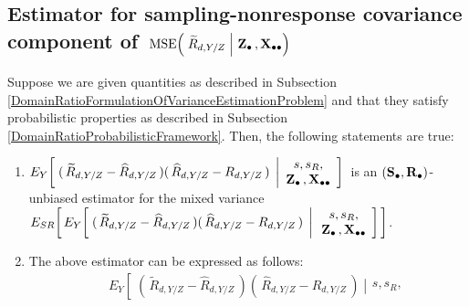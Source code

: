 
\vskip 0.5cm
\subsection{Estimator for sampling-nonresponse covariance component of
\,$\textnormal{MSE}\!\left(\,\left.\widetilde{R}_{d,Y/Z}\;\right\vert\,\mathbf{Z}_{\bullet}\,,\mathbf{X}_{\bullet\bullet}\right)$}
\setcounter{theorem}{0}


\begin{lemma}
\label{DomainRatioMixedVariance}
\mbox{}
\vskip 0.1cm
\noindent
Suppose we are given quantities as described in Subsection
\ref{DomainRatioFormulationOfVarianceEstimationProblem}
and
that they satisfy probabilistic properties as described in Subsection
\ref{DomainRatioProbabilisticFramework}.
\vskip 0.1cm
\noindent
Then, the following statements are true:
\renewcommand{\theenumi}{\roman{enumi}}
\renewcommand{\labelenumi}{\mbox{}\;\;\,(\theenumi)$\quad$}
\begin{enumerate}
\item
    $
    E_{Y}\!\left[\;
        (\,\widetilde{R}_{d,Y/Z} - \widehat{R}_{d,Y/Z}\,)
        (\,  \widehat{R}_{d,Y/Z} - R_{d,Y/Z}\,)
        \;\left\vert
        \begin{array}{c}
            s,s_{R},
            \\
            \mathbf{Z}_{\bullet}\,,\mathbf{X}_{\bullet\bullet}
            \end{array}
        \right.
        \!\right]
    $\,
    is an $(\mathbf{S}_{\bullet},\mathbf{R}_{\bullet})$-unbiased estimator for the mixed variance
    \,$
    E_{SR}\!\left[\,
    E_{Y}\!\left[\;
        (\,\widetilde{R}_{d,Y/Z} - \widehat{R}_{d,Y/Z}\,)
        (\,  \widehat{R}_{d,Y/Z} - R_{d,Y/Z}\,)
        \;\left\vert\,
        \begin{array}{c}
            s,s_{R},
            \\
            \mathbf{Z}_{\bullet}\,,\mathbf{X}_{\bullet\bullet}
            \end{array}
        \right.
        \!\right]
        \,\right]
    $.
\item
    The above estimator can be expressed as follows:
    \begin{eqnarray*}
    &&
        E_{Y}\!\left[\;
            (\,\widetilde{R}_{d,Y/Z} - \widehat{R}_{d,Y/Z}\,)
            (\,  \widehat{R}_{d,Y/Z} - R_{d,Y/Z}\,)
            \;\left\vert
            \begin{array}{c}
                s,s_{R},

\end{array}
\end{eqnarray*}
\end{enumerate}
\end{lemma}
